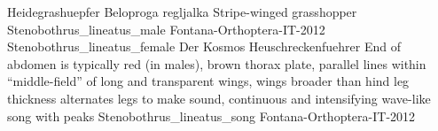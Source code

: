 {Heidegrashuepfer} %
{Beloproga regljalka} %
{Stripe-winged grasshopper} %
{Stenobothrus_lineatus_male} %
{Fontana-Orthoptera-IT-2012} %
{Stenobothrus_lineatus_female} %
{Der Kosmos Heuschreckenfuehrer} %
{End of abdomen is typically red (in males), brown thorax plate, parallel lines within ``middle-field'' of long and transparent wings, wings broader than hind leg thickness} %
{alternates legs to make sound, continuous and intensifying wave-like song with peaks} %
{Stenobothrus_lineatus_song} %
{Fontana-Orthoptera-IT-2012} %

